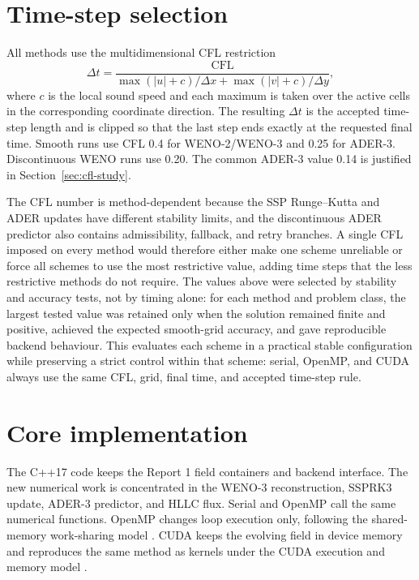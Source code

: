 \section{Time-step selection}

All methods use the multidimensional CFL restriction \cite{courant1967}
\begin{equation}
\Delta t=\frac{\mathrm{CFL}}
{\max(|u|+c)/\Delta x+\max(|v|+c)/\Delta y},
\label{eq:cfl}
\end{equation}
where \(c\) is the local sound speed and each maximum is taken over the active
cells in the corresponding coordinate direction. The resulting
\(\Delta t\) is the accepted time-step length and is clipped so that the last
step ends exactly at the requested final time. Smooth runs use CFL 0.4 for WENO-2/WENO-3 and 0.25 for ADER-3. Discontinuous WENO runs use 0.20. The
common ADER-3 value 0.14 is justified in Section~\ref{sec:cfl-study}.

The CFL number is method-dependent because the SSP Runge--Kutta and ADER updates have different stability limits, and the discontinuous ADER predictor also contains admissibility, fallback, and retry branches. A single CFL imposed on every method would therefore either make one scheme unreliable or force all schemes to use the most restrictive value, adding time steps that the less restrictive methods do not require. The values above were selected by stability and accuracy tests, not by timing alone: for each method and problem class, the largest tested value was retained only when the solution remained finite and positive, achieved the expected smooth-grid accuracy, and gave reproducible backend behaviour. This evaluates each scheme in a practical stable configuration while preserving a strict control within that scheme: serial, OpenMP, and CUDA always use the same CFL, grid, final time, and accepted time-step rule.

\section{Core implementation}

The C++17 code keeps the Report 1 field containers and backend interface. The new numerical work is concentrated in the WENO-3 reconstruction, SSPRK3 update, ADER-3 predictor, and HLLC flux. Serial and OpenMP call the same numerical functions. OpenMP changes loop execution only, following the shared-memory work-sharing model \cite{openmp52}. CUDA keeps the evolving field in device memory and reproduces the same method as kernels under the CUDA execution and memory model \cite{nvidia129}.

